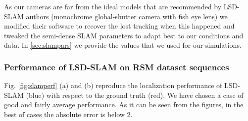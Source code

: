 As our cameras are far from the ideal models that are recommended by LSD-SLAM authors (monochrome global-shutter camera with fish eye lens) we modified their software to recover the lost tracking when this happened and tweaked the semi-dense SLAM parameters to adapt best to our conditions and data. In \ref{sec:slampars} we provide the values that we used for our simulations.

\subsubsection{Performance of LSD-SLAM on RSM dataset sequences}

Fig. \ref{fig:slamperf} (a) and (b) reproduce the localization performance of LSD-SLAM (blue) with respect to the ground truth (red). We have chosen a case of good and fairly average performance. As it can be seen from the figures, in the best of cases the absolute error is below 2. 

